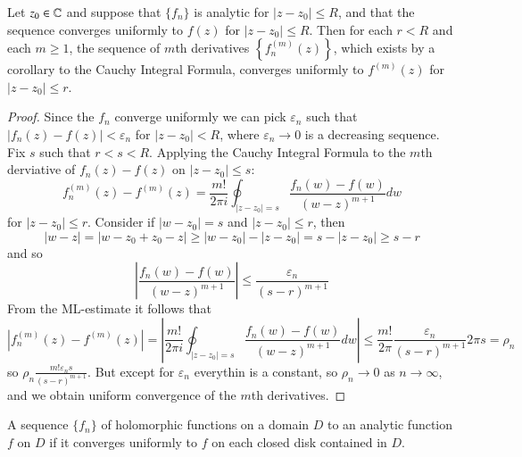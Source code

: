 \begin{theorem}
    Let $z_0 \in \mathbb C$ and suppose that $\{f_n\}$ is analytic for $|z-z_0| \leq R$, and that the sequence converges uniformly to $f(z)$ for $|z-z_0| \leq R$. Then for each $r < R$ and each $m\geq 1$, the sequence of $m$th derivatives $\left\{f^{(m)}_n(z)\right\}$, which exists by a corollary to the Cauchy Integral Formula, converges uniformly to $f^{(m)}(z)$ for $|z-z_0| \leq r$.
\end{theorem}
\begin{proof}
    Since the $f_n$ converge uniformly we can pick $\varepsilon_n$ such that $|f_n(z) - f(z)| < \varepsilon_n$ for $|z - z_0| < R$, where $\varepsilon_n\rightarrow 0$ is a decreasing sequence. Fix $s$ such that $r < s < R$. Applying the Cauchy Integral Formula to the $m$th derviative of $f_n(z)-f(z)$ on $|z-z_0|\leq s$: \begin{equation*}
        f_n^{(m)}(z) - f^{(m)}(z) = \frac{m!}{2\pi i}\oint_{|z-z_0|=s}\frac{f_n(w)- f(w)}{(w-z)^{m+1}}dw
    \end{equation*}
    for $|z-z_0| \leq r$. Consider if $|w-z_0| = s$ and $|z-z_0| \leq r$, then \begin{equation*}
        |w-z| = |w-z_0+z_0-z| \geq |w-z_0|-|z-z_0| = s-|z-z_0| \geq s-r 
    \end{equation*}
    and so \begin{equation*}
        \left|\frac{f_n(w)-f(w)}{(w-z)^{m+1}}\right|\leq \frac{\varepsilon_n}{(s-r)^{m+1}}
    \end{equation*}
    From the ML-estimate it follows that \begin{equation*}
        \left|f_n^{(m)}(z) - f^{(m)}(z) \right|= \left|\frac{m!}{2\pi i}\oint_{|z-z_0|=s}\frac{f_n(w)- f(w)}{(w-z)^{m+1}}dw\right| \leq \frac{m!}{2\pi}\frac{\varepsilon_n}{(s-r)^{m+1}}2\pi s = \rho_n
    \end{equation*}
    so $\rho_n \frac{m!\varepsilon_ns}{(s-r)^{m+1}}$. But except for $\varepsilon_n$ everythin is a constant, so $\rho_n\rightarrow 0$ as $n\rightarrow \infty$, and we obtain uniform convergence of the $m$th derivatives.
\end{proof}

\begin{definition}
    A sequence $\{f_n\}$ of holomorphic functions on a domain $D$  to an analytic function $f$ on $D$ if it converges uniformly to $f$ on each closed disk contained in $D$.
\end{definition}


